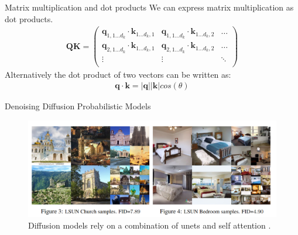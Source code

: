 \documentclass{beamer}
\begin{document}
    \begin{frame}{Matrix multiplication and dot products}
      We can express matrix multiplication as dot products.
      \begin{align}
        \mathbf{Q}\mathbf{K} = 
        \begin{pmatrix}
          \mathbf{q}_{1, 1 \dots d_k} \cdot \mathbf{k}_{1 \dots d_k, 1} &  \mathbf{q}_{1, 1 \dots d_k} \cdot \mathbf{k}_{1 \dots d_k, 2} & \dots \\
          \mathbf{q}_{2, 1 \dots d_k} \cdot \mathbf{k}_{1 \dots d_k, 1} &  \mathbf{q}_{2, 1 \dots d_k} \cdot \mathbf{k}_{1 \dots d_k, 2} & \dots \\
          \vdots                                                        &  \vdots                                                        & \ddots \\
        \end{pmatrix}
      \end{align}
      Alternatively the dot product of two vectors can be written as:
      \begin{align}
        \mathbf{q} \cdot \mathbf{k} = |\mathbf{q}| |\mathbf{k}| cos(\theta)
      \end{align}
      \begin{figure}
        
      \end{figure}
    \end{frame}



    \begin{frame}{Denoising Diffusion Probabilistic Models}
      \begin{figure}
        \includegraphics[width=0.9\linewidth]{./figures/diffusion_example.png}
        \caption{Diffusion models rely on a combination of unets and self attention \cite{ho2020denoising}.}
      \end{figure}
    \end{frame}
\end{document}
